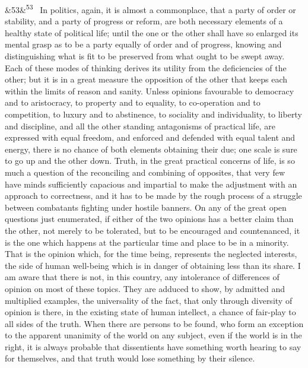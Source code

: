 \documentclass[12pt]{article}
\newcommand{\para}[1][]{\par\noindent\ifx&#1&\else\textsuperscript{\footnotesize #1}~\fi}
\begin{document}
\para[53] In politics, again, it is almost a commonplace, that a party of order or stability, and a party of progress or reform, are both necessary elements of a healthy state of political life; until the one or the other shall have so enlarged its mental grasp as to be a party equally of order and of progress, knowing and distinguishing what is fit to be preserved from what ought to be swept away. Each of these modes of thinking derives its utility from the deficiencies of the other; but it is in a great measure the opposition of the other that keeps each within the limits of reason and sanity. Unless opinions favourable to democracy and to aristocracy, to property and to equality, to co-operation and to competition, to luxury and to abstinence, to sociality and individuality, to liberty and discipline, and all the other standing antagonisms of practical life, are expressed with equal freedom, and enforced and defended with equal talent and energy, there is no chance of both elements obtaining their due; one scale is sure to go up and the other down. Truth, in the great practical concerns of life, is so much a question of the reconciling and combining of opposites, that very few have minds sufficiently capacious and impartial to make the adjustment with an approach to correctness, and it has to be made by the rough process of a struggle between combatants fighting under hostile banners. On any of the great open questions just enumerated, if either of the two opinions has a better claim than the other, not merely to be tolerated, but to be encouraged and countenanced, it is the one which happens at the particular time and place to be in a minority. That is the opinion which, for the time being, represents the neglected interests, the side of human well-being which is in danger of obtaining less than its share. I am aware that there is not, in this country, any intolerance of differences of opinion on most of these topics. They are adduced to show, by admitted and multiplied examples, the universality of the fact, that only through diversity of opinion is there, in the existing state of human intellect, a chance of fair-play to all sides of the truth. When there are persons to be found, who form an exception to the apparent unanimity of the world on any subject, even if the world is in the right, it is always probable that dissentients have something worth hearing to say for themselves, and that truth would lose something by their silence.
\end{document}
